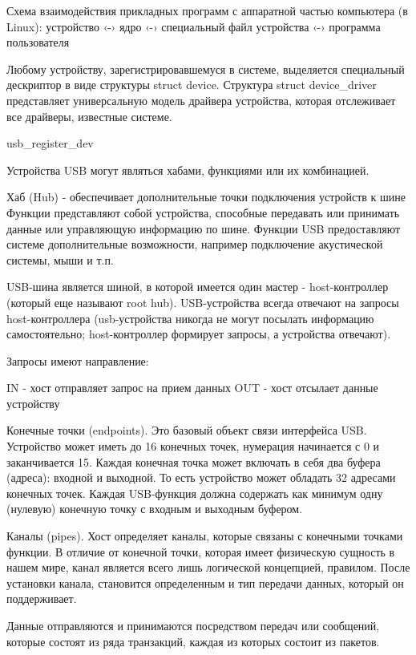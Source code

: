 Схема взаимодействия прикладных программ с аппаратной частью компьютера (в Linux): устройство ‹-› ядро ‹-› специальный файл устройства ‹-› программа пользователя

Любому устройству, зарегистрировавшемуся в системе, выделяется специальный дескриптор в виде структуры struct device. Структура struct device\_driver представляет универсальную модель драйвера устройства, которая отслеживает все драйверы, известные системе.

usb\_register\_dev

Устройства USB могут являться хабами, функциями или их комбинацией.

Хаб (Hub) - обеспечивает дополнительные точки подключения устройств к шине
Функции представляют собой устройства, способные передавать или принимать данные или управляющую информацию по шине. Функции USB предоставляют системе дополнительные возможности, например подключение акустической системы, мыши и т.п.

USB-шина является шиной, в которой имеется один мастер - host-контроллер (который еще называют root hub). USB-устройства всегда отвечают на запросы host-контроллера (usb-устройства никогда не могут посылать информацию самостоятельно; host-контроллер формирует запросы, а устройства отвечают).



Запросы имеют направление:

IN - хост отправляет запрос на прием данных
OUT - хост отсылает данные устройству \cite{corbet2005linux}

Конечные точки (endpoints). Это базовый объект связи интерфейса USB. Устройство может иметь до 16 конечных точек, нумерация начинается с 0 и заканчивается 15. Каждая конечная точка может включать в себя два буфера (адреса): входной и выходной. То есть устройство может обладать 32 адресами конечных точек. Каждая USB-функция должна содержать как минимум одну (нулевую) конечную точку с входным и выходным буфером.

Каналы (pipes). Хост определяет каналы, которые связаны с конечными точками функции. В отличие от конечной точки, которая имеет физическую сущность в нашем мире, канал является всего лишь логической концепцией, правилом. После установки канала, становится определенным и тип передачи данных, который он поддерживает.

Данные отправляются и принимаются посредством передач или сообщений, которые состоят из ряда транзакций, каждая из которых состоит из пакетов.

